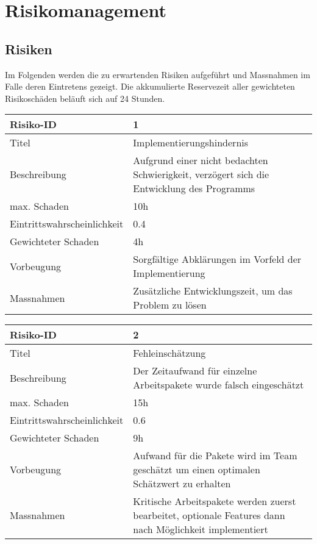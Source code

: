 \chapter{Risikomanagement}
\section{Risiken}

Im Folgenden werden die zu erwartenden Risiken aufgeführt und Massnahmen im Falle deren Eintretens gezeigt. Die akkumulierte Reservezeit aller gewichteten Risikoschäden beläuft sich auf 
24 Stunden.

\begin{table}[h!]
	\centering
	\begin{tabular}{|p{} | p{} |}
	\hline	
	Risiko-ID & 1 \\
	\hline
	Titel & Implementierungshindernis \\
	Beschreibung & Aufgrund einer nicht bedachten Schwierigkeit, verzögert sich die Entwicklung des Programms \\
	max. Schaden	& 10h \\
	Eintrittswahrscheinlichkeit & 0.4 \\
	Gewichteter Schaden	& 4h \\
	Vorbeugung	& Sorgfältige Abklärungen im Vorfeld der Implementierung \\
	Massnahmen	& Zusätzliche Entwicklungszeit, um das Problem zu lösen \\
	\hline
	\end{tabular}
\end{table}

\begin{table}[h!]
	\centering
	\begin{tabular}{|p{} | p{} |}
	\hline
	Risiko-ID & 2 \\
	\hline
	Titel & Fehleinschätzung \\
	Beschreibung & Der Zeitaufwand für einzelne Arbeitspakete wurde falsch eingeschätzt \\
	max. Schaden	& 15h \\
	Eintrittswahrscheinlichkeit & 0.6 \\
	Gewichteter Schaden	& 9h \\
	Vorbeugung	& Aufwand für die Pakete wird im Team geschätzt um einen optimalen Schätzwert zu erhalten \\
	Massnahmen	& Kritische Arbeitspakete werden zuerst bearbeitet, optionale Features dann nach Möglichkeit implementiert \\
	\hline	
	\end{tabular}
\end{table}


